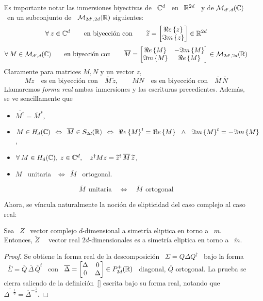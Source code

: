Es importante notar  las inmersiones biyectivas de \ $\mathbb{C}^d$  \ en \ $\mathbb{R}^{2
  d}$ \  y de $\mathcal{M}_{d',d}(\mathbb{C})$ \  en un subconjunto de  \ $\mathcal{M}_{2 d', 2d}(\mathbb{R})$
siguientes:
%
\[
\forall \: z  \in \mathbb{C}^d \qquad \mbox{en biyecci\'on  con} \qquad \widetilde{z}
= \begin{bmatrix} \Re e \left\{ z \right\}\\ \Im m \left\{ z \right\} \end{bmatrix} \in \mathbb{R}^{2 d}
\]
%
\[
\forall  \:  M \in  \mathcal{M}_{d',d}(\mathbb{C})  \qquad  \mbox{en  biyecci\'on con}  \qquad
\overline{M}   =   \begin{bmatrix}   \Re e \left\{ M \right\}   &  -   \Im m \left\{ M \right\}\\   \Im m \left\{ M \right\}   &
  \Re e \left\{ M \right\} \end{bmatrix} \in \mathcal{M}_{2d',2d}(\mathbb{R})
\]
%
Claramente para matrices $M, N$ y un vector $z$,
%
\[
M z \quad \mbox{es en biyecci\'on con} \quad \overline{M} \, \widetilde{z}, \qquad
M N \quad \mbox{es en biyecci\'on con} \quad \overline{M} \, \overline{N}
\]
%
Llamaremos   {\em    forma   real}   ambas   inmersiones    y   las   escrituras
precedientes. Adem\'as, se ve sencillamente que
%
\begin{itemize}
\item  $\displaystyle   \overline{M^\dag}  =  \overline{M}^{\,   t}$,
%
\item $\displaystyle M \in H_d(\mathbb{C}) \:\: \Leftrightarrow \:\:
  \overline{M}  \in  S_{2d}(\mathbb{R})  \:\:  \Leftrightarrow  \:\:  \Re e \left\{ M \right\}^t  =
  \Re e \left\{ M \right\} \, \:\: \wedge \:\: \, \Im m \left\{ M \right\}^t = - \Im m \left\{ M \right\}$,
%
\item  $\forall \:  M \in  H_d(\mathbb{C}), \:  z  \in \mathbb{C}^d,  \quad z^\dag  M z  =
  \widetilde{z}^t \, \overline{M} \, \widetilde{z}$,
%
\item $M$ \ unitaria $\:\:\Leftrightarrow\:\: \overline{M}$ \ ortogonal.
\end{itemize}
%
\[
\overline{M} \:\: \mbox{unitaria}  \quad \Leftrightarrow \quad \overline{M} \:\:
\mbox{ortogonal}
\]

Ahora, se v\'incula naturalmente la noci\'on de elipticidad del caso complejo al
caso real:
%
\begin{lema}
  Sea \ $Z$ \ vector complejo  $d$-dimensional a simetr\'ia eliptica en torno a
  \  $m$.  Entonces,  $\widetilde{Z}$ \  \ vector  real $2d$-dimensionales  es a
  simetr\'ia eliptica en torno a \ $\widetilde{m}$.
\end{lema}
%
\begin{proof}
  Se obtiene la forma real de la descomposici\'on \ $\Sigma = Q \Delta Q^\dag$ \
  bajo  la forma  \ $\overline{\Sigma}  = \overline{Q}  \,  \overline{\Delta} \,
  \overline{Q}^t$ \ con \ $\overline{\Delta}  = \begin{bmatrix} \Delta & 0\\ 0 &
    \Delta  \end{bmatrix}   \in  P_{2d}^+(\mathbb{R})$  \   diagonal,  $\overline{Q}$
  ortogonal.   La prueba se  cierra saliendo  de la  definici\'on~\ref{} escrita
  bajo   su   forma    real,   notando   que   $\overline{\Delta^{-\frac12}}   =
  \overline{\Delta}^{-\frac12}$.
\end{proof}

